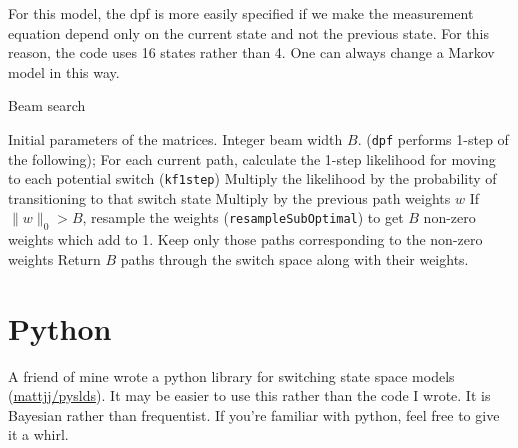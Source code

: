 \documentclass[11pt]{article}
\newcommand{\norm}[1]{\lVert #1 \rVert}
\begin{document}
For this model, the dpf is more easily specified if we make the
measurement equation depend only on the current state and not the
previous state. For this reason, the code uses 16 states rather than
4. One can always change a Markov model in this way.

\begin{algorithm}[t!]
  \caption{Beam search\label{alg:beamsearch}}
  \begin{algorithmic}[1]
  Initial parameters of the matrices. Integer beam width $B$.
  \STATE (\texttt{dpf} performs 1-step of the following);
  \STATE For each current path, calculate the 1-step likelihood for
  moving to each potential switch (\texttt{kf1step})\;
  \STATE Multiply the likelihood by the probability of transitioning
  to that switch state\;
  \STATE Multiply by the previous path weights $w$\;
  \STATE If $\norm{w}_0>B$, resample the weights\;
  (\texttt{resampleSubOptimal}) to get $B$ non-zero weights which
  add to 1.\;
  \STATE Keep only those paths corresponding to the non-zero weights\;
  \ENDFOR
  \STATE Return $B$ paths through the switch space along with their weights.\;
\end{algorithmic}
\end{algorithm}


\section{Python}

A friend of mine wrote a python library for switching state space
models (\href{https://github.com/mattjj/pyslds}{mattjj/pyslds}). It
may be easier to use this rather than the code I wrote. It is Bayesian
rather than frequentist. If you're familiar with python, feel free to
give it a whirl.



\end{document}
